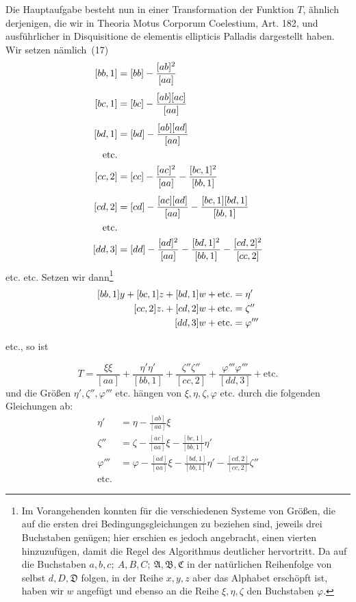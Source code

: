 Die Hauptaufgabe besteht nun in einer Transformation der Funktion \(T\), ähnlich derjenigen, die wir in Theoria Motus Corporum Coelestium, Art. 182, und ausführlicher in Disquisitione de elementis ellipticis Palladis dargestellt haben. Wir setzen nämlich~(17)
\[
\begin{aligned}\relax
[bb,1]&=[bb]-\frac{[ab]^2}{[aa]}\\[4pt]
[bc,1]&=[bc]-\frac{[ab][ac]}{[aa]}\\[4pt]
[bd,1]&=[bd]-\frac{[ab][ad]}{[aa]}\\
\text{etc.}&\\
[cc,2]&=[cc]-\frac{[ac]^2}{[aa]}-\frac{[bc,1]^2}{[bb,1]}\\[4pt]
[cd,2]&=[cd]-\frac{[ac][ad]}{[aa]}-\frac{[bc,1][bd,1]}{[bb,1]}\\
\text{etc.}&\\
[dd,3]&=[dd]-\frac{[ad]^2}{[aa]}-\frac{[bd,1]^2}{[bb,1]}-\frac{[cd,2]^2}{[cc,2]}
\end{aligned}
\]
etc. etc. Setzen wir dann\footnote{Im Vorangehenden konnten für die verschiedenen Systeme von Größen, die auf die ersten drei Bedingungsgleichungen zu beziehen sind, jeweils drei Buchstaben genügen; hier erschien es jedoch angebracht, einen vierten hinzuzufügen, damit die Regel des Algorithmus deutlicher hervortritt. Da auf die Buchstaben \(a,b,c;\ A,B,C;\ \mathfrak A,\mathfrak B,\mathfrak C\) in der natürlichen Reihenfolge von selbst \(d,D,\mathfrak D\) folgen, in der Reihe \(x,y,z\) aber das Alphabet erschöpft ist, haben wir \(w\) angefügt und ebenso an die Reihe \(\xi,\eta,\zeta\) den Buchstaben \(\varphi\).}
\[
\begin{aligned}\relax
[bb,1]y+[bc,1]z+[bd,1]w+\text{etc.}&=\eta'\\
[cc,2]z.+[cd,2]w+\text{etc.}&=\zeta''\\
[dd,3]w+\text{etc.}&=\varphi'''
\end{aligned}
\]
\begin{center}etc., so ist\end{center}
\[
T=\frac{\xi\xi}{[aa]}+\frac{\eta'\eta'}{[bb,1]}+\frac{\zeta''\zeta''}{[cc,2]}+\frac{\varphi'''\varphi'''}{[dd,3]}+\text{etc.}
\]
und die Größen \(\eta',\zeta'',\varphi'''\) etc. hängen von \(\xi,\eta,\zeta,\varphi\) etc. durch die folgenden Gleichungen ab:
\[
\begin{aligned}
\eta'&=\eta-\frac{[ab]}{[aa]}\xi\\[5pt]
\zeta''&=\zeta-\frac{[ac]}{[aa]}\xi-\frac{[bc,1]}{[bb,1]}\eta'\\[5pt]
\varphi'''&=\varphi-\frac{[ad]}{[aa]}\xi-\frac{[bd,1]}{[bb,1]}\eta'-\frac{[cd,2]}{[cc,2]}\zeta''\\
\text{etc.}&
\end{aligned}
\]

